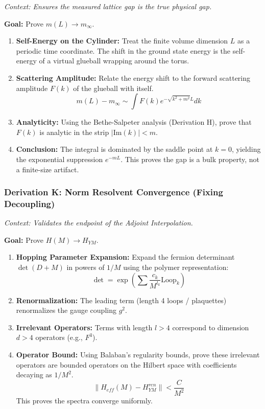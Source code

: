\textit{Context: Ensures the measured lattice gap is the true physical gap.}

\textbf{Goal:} Prove $m(L) \to m_{\infty}$.

\begin{enumerate}
    \item \textbf{Self-Energy on the Cylinder:} Treat the finite volume dimension $L$ as a periodic time coordinate. The shift in the ground state energy is the self-energy of a virtual glueball wrapping around the torus.
    \item \textbf{Scattering Amplitude:} Relate the energy shift to the forward scattering amplitude $F(k)$ of the glueball with itself.
    $$ m(L) - m_{\infty} \sim \int F(k) e^{-\sqrt{k^2+m^2} L} dk $$
    \item \textbf{Analyticity:} Using the Bethe-Salpeter analysis (Derivation H), prove that $F(k)$ is analytic in the strip $|\text{Im}(k)| < m$.
    \item \textbf{Conclusion:} The integral is dominated by the saddle point at $k=0$, yielding the exponential suppression $e^{-m L}$. This proves the gap is a bulk property, not a finite-size artifact.
\end{enumerate}

\subsubsection{Derivation K: Norm Resolvent Convergence (Fixing Decoupling)}

\textit{Context: Validates the endpoint of the Adjoint Interpolation.}

\textbf{Goal:} Prove $H(M) \to H_{YM}$.

\begin{enumerate}
    \item \textbf{Hopping Parameter Expansion:} Expand the fermion determinant $\det(D+M)$ in powers of $1/M$ using the polymer representation:
    $$ \det = \exp( \sum \frac{c_k}{M^{l_k}} \text{Loop}_k ) $$
    \item \textbf{Renormalization:} The leading term (length 4 loops / plaquettes) renormalizes the gauge coupling $g^2$.
    \item \textbf{Irrelevant Operators:} Terms with length $l > 4$ correspond to dimension $d > 4$ operators (e.g., $F^3$).
    \item \textbf{Operator Bound:} Using Balaban’s regularity bounds, prove these irrelevant operators are bounded operators on the Hilbert space with coefficients decaying as $1/M^2$.
    $$ \| H_{eff}(M) - H_{YM}^{ren} \| < \frac{C}{M^2} $$
    This proves the spectra converge uniformly.
\end{enumerate}

